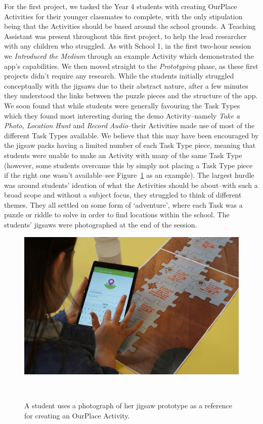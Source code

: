 \documentclass[,hyphens]{sigchi}
\begin{document}
For the first project, we tasked the Year 4 students with creating OurPlace Activities for their younger classmates to complete, with the only stipulation being that the Activities should be based around the school grounds. A Teaching Assistant was present throughout this first project, to help the lead researcher with any children who struggled. As with School 1, in the first two-hour session we \textit{Introduced the Medium} through an example Activity which demonstrated the app's capabilities. We then moved straight to the \textit{Prototyping} phase, as these first projects didn't require any research. While the students initially struggled conceptually with the jigsaws due to their abstract nature, after a few minutes they understood the links between the puzzle pieces and the structure of the app. We soon found that while students were generally favouring the Task Types which they found most interesting during the demo Activity--namely \textit{Take a Photo, Location Hunt} and \textit{Record Audio}--their Activities made use of most of the different Task Types available. We believe that this may have been encouraged by the jigsaw packs having a limited number of each Task Type piece, meaning that students were unable to make an Activity with many of the same Task Type (however, some students overcame this by simply not placing a Task Type piece if the right one wasn't available--see Figure~\ref{fig:JigsawToApp} as an example). The largest hurdle was around students' ideation of what the Activities should be about--with such a broad scope and without a subject focus, they struggled to think of different themes. They all settled on some form of `adventure', where each Task was a puzzle or riddle to solve in order to find locations within the school. The students' jigsaws were photographed at the end of the session.

\begin{figure}
\centering
  \includegraphics[width=1\columnwidth]{figures/jigsawToApp}
  \caption{A student uses a photograph of her jigsaw prototype as a reference for creating an OurPlace Activity.}~\label{fig:JigsawToApp}
\end{figure}
\end{document}
